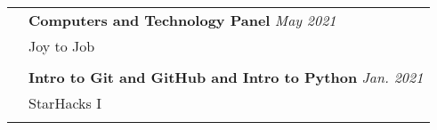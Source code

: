 \documentclass[letterpaper, 11pt]{article}
\begin{document}
\begin{longtable}{p{1.3in}p{4.8in}}
	 & \textbf{Computers and Technology Panel} \hfill \textit{May 2021}                                                                                                                                                                                                                                                                                                                          \\
	 & Joy to Job                                                                                                                                                                                                                                                                                                                                                                                \\
	 &                                                                                                                                                                                                                                                                                                                                                                                           \\

	 & \textbf{Intro to Git and GitHub and Intro to Python} \hfill \textit{Jan. 2021}                                                                                                                                                                                                                                                                                                            \\
	 & StarHacks I                                                                                                                                                                                                                                                                                                                                                                               \\
	 &                                                                                                                                                                                                                                                                                                                                                                                           \\


\end{longtable}
\end{document}
